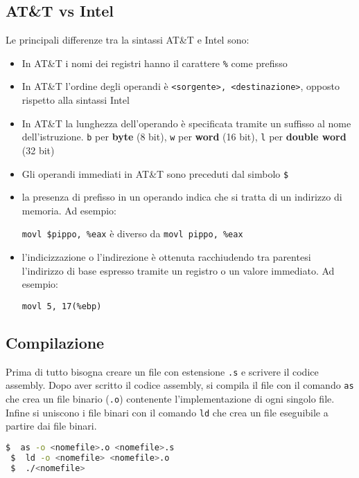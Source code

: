 \documentclass[a4paper]{article}
\theoremstyle{break}
\theoremstyle{break}
\theoremstyle{break}
\theoremstyle{break}
\begin{document}
\subsection{AT\&T vs Intel}
Le principali differenze tra la sintassi AT\&T e Intel sono:
\begin{itemize}
	\item In AT\&T i nomi dei registri hanno il carattere \texttt{\%} come prefisso
	\item In AT\&T l'ordine degli operandi è \texttt{<sorgente>, <destinazione>}, opposto
	      rispetto alla sintassi Intel
	\item In AT\&T la lunghezza dell'operando è specificata tramite un suffisso al nome
	      dell'istruzione. \texttt{b} per \textbf{byte} (8 bit), \texttt{w} per \textbf{word} (16 bit),
	      \texttt{l} per \textbf{double word} (32 bit)
	\item Gli operandi immediati in AT\&T sono preceduti dal simbolo \texttt{\$}
	\item la presenza di prefisso in un operando indica che si tratta di un
	      indirizzo di memoria. Ad esempio:
	      \begin{center}
		      \texttt{movl \$pippo, \%eax} \quad è diverso da \quad \texttt{movl pippo, \%eax}
	      \end{center}
	\item l'indicizzazione o l'indirezione è ottenuta racchiudendo tra parentesi
	      l'indirizzo di base espresso tramite un registro o un valore immediato.
	      Ad esempio:
	      \begin{center}
		      \texttt{movl 5, 17(\%ebp)}
	      \end{center}
\end{itemize}

\subsection{Compilazione}
Prima di tutto bisogna creare un file con estensione \texttt{.s} e scrivere il codice assembly.
Dopo aver scritto il codice assembly, si compila il file con il comando \texttt{as} che crea un file binario
(\texttt{.o}) contenente l'implementazione di ogni singolo file. Infine si uniscono i file binari con il comando
\texttt{ld} che crea un file eseguibile a partire dai file binari.

\begin{lstlisting}[language=bash]
 $  as -o <nomefile>.o <nomefile>.s
 $  ld -o <nomefile> <nomefile>.o
 $  ./<nomefile>
  
\end{lstlisting}

\end{document}
